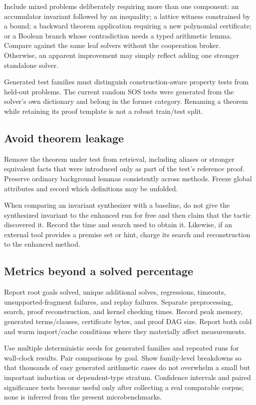 \documentclass[11pt,a4paper]{article}
\begin{document}
Include mixed problems deliberately requiring more than one component: an accumulator invariant followed by an inequality; a lattice witness constrained by a bound; a backward theorem application requiring a new polynomial certificate; or a Boolean branch whose contradiction needs a typed arithmetic lemma. Compare against the same leaf solvers without the cooperation broker. Otherwise, an apparent improvement may simply reflect adding one stronger standalone solver.

Generated test families must distinguish construction-aware property tests from held-out problems. The current random SOS tests were generated from the solver's own dictionary and belong in the former category. Renaming a theorem while retaining its proof template is not a robust train/test split.

\subsection{Avoid theorem leakage}

Remove the theorem under test from retrieval, including aliases or stronger equivalent facts that were introduced only as part of the test's reference proof. Preserve ordinary background lemmas consistently across methods. Freeze global attributes and record which definitions may be unfolded.

When comparing an invariant synthesizer with a baseline, do not give the synthesized invariant to the enhanced run for free and then claim that the tactic discovered it. Record the time and search used to obtain it. Likewise, if an external tool provides a premise set or hint, charge its search and reconstruction to the enhanced method.

\subsection{Metrics beyond a solved percentage}

Report root goals solved, unique additional solves, regressions, timeouts, unsupported-fragment failures, and replay failures. Separate preprocessing, search, proof reconstruction, and kernel checking times. Record peak memory, generated terms/clauses, certificate bytes, and proof DAG size. Report both cold and warm import/cache conditions where they materially affect measurements.

Use multiple deterministic seeds for generated families and repeated runs for wall-clock results. Pair comparisons by goal. Show family-level breakdowns so that thousands of easy generated arithmetic cases do not overwhelm a small but important induction or dependent-type stratum. Confidence intervals and paired significance tests become useful only after collecting a real comparable corpus; none is inferred from the present microbenchmarks.
\end{document}
